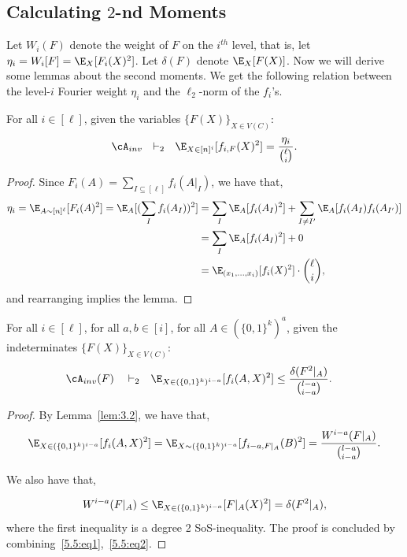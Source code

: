 \subsection{Calculating $2$-nd Moments}
Let $W_i(F)$ denote the weight of $F$ on the $i^{th}$ level, that is, let $\eta_i = W_i[F] = \E_X[F_i(X)^2]$. Let $\delta(F)$ denote $\E_X[F(X)]$. Now we will derive some lemmas about the second moments. We get the following relation between the level-$i$ Fourier weight $\eta_i$ and the $\ell_2$-norm of the $f_i$'s.

\begin{lemma}\label{lem:3.2}
For all $i \in [\ell]$, given the variables $\{F(X)\}_{X \in V(C)}$:
$$\cA_{inv} ~~\vdash_2 ~~\E_{X \in [n]^{i}}[f_{i,F}(X)^2] =  \frac{\eta_{i}}{\binom{\ell}{i}}.$$
\end{lemma}

\begin{proof}
Since $F_i(A) = \sum_{I \subseteq [\ell]}f_i(A|_I)$, we have that, 
\begin{align*}
    \eta_i=\E_{A \sim [n]^{\ell}}[F_i(A)^2] = 
    \E_A[(\sum_I f_i(A_I))^2] 
    &= \sum_I \E_A[ f_i(A_I)^2] + \sum_{I \neq I'} \E_{A}[f_i(A_I)f_i(A_{I'})] \\
    &= \sum_I \E_A[ f_i(A_I)^2] + 0 \\
    &= \E_{(x_1,\ldots,x_i)}[f_i(X)^2] \cdot \binom{\ell}{i},
\end{align*}
and rearranging implies the lemma. 
\end{proof}




\begin{lemma}\label{lem:p.r.-weight}
For all $i \in [\ell]$, for all $a,b \in [i]$, for all $A \in (\{0,1\}^k)^a$, given the indeterminates $\{F(X)\}_{X \in V(C)}$:
\begin{align*}
\cA_{inv}(F) ~~~\vdash_2 ~~~ &\E_{X \in (\{0,1\}^k)^{i-a}}[f_i(A,X)^2] \leq \frac{\delta(F^{ 2}|_A)}{{l-a \choose i-a}}.
\end{align*}
\end{lemma}

\begin{proof}
By Lemma~\ref{lem:3.2}, we have that,
\begin{align}
\E_{X \in (\{0,1\}^k)^{i-a}}[f_i(A,X)^2] = \E_{X \sim (\{0,1\}^k)^{i-a}}[f_{i-a,F|_A}(B)^2] = \frac{W^{i-a}(F|_A)}{{l-a \choose i-a}}. \label{5.5:eq1}
\end{align}

We also have that,

\begin{align}
W^{i-a}(F|_A) \leq \E_{X \in (\{0,1\}^k)^{i-a}}[F|_A(X)^2] = \delta(F^{ 2}|_A), \label{5.5:eq2}
\end{align}
where the first inequality is a degree 2 SoS-inequality. The proof is concluded by combining~\eqref{5.5:eq1},~\eqref{5.5:eq2}.
\end{proof}


